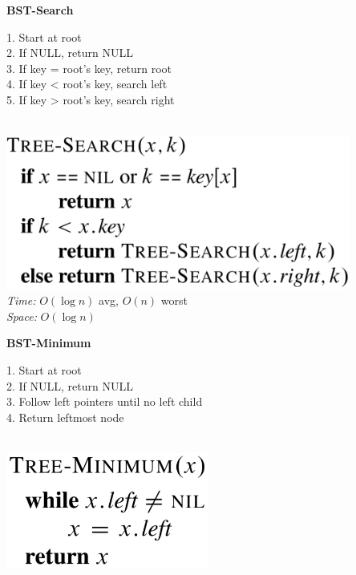 {\begin{minipage}[t]{1\textwidth}
    \begin{minipage}[t]{0.19\textwidth}
        \centering
        \textbf{\scriptsize BST-Search}\\[2pt]
        \scriptsize
        \begin{minipage}[t]{\textwidth}
            \scriptsize
            1. Start at root\\
            2. If NULL, return NULL\\
            3. If key = root's key, return root\\
            4. If key < root's key, search left\\
            5. If key > root's key, search right
        \end{minipage}\\[3pt]
        \includegraphics[width=0.85\textwidth]{images/bst-search.png}\\[2pt]
        \textit{Time:} \(O(\log n)\) avg, \(O(n)\) worst\\
        \textit{Space:} \(O(\log n)\)
    \end{minipage}
    \hfill
    \begin{minipage}[t]{0.19\textwidth}
        \centering
        \textbf{\scriptsize BST-Minimum}\\[2pt]
        \scriptsize
        \begin{minipage}[t]{\textwidth}
            \scriptsize
            1. Start at root\\
            2. If NULL, return NULL\\
            3. Follow left pointers until no left child\\
            4. Return leftmost node
        \end{minipage}\\[8pt]
        \includegraphics[width=0.5\textwidth]{images/bst-minimum.png}\\[2pt]

\end{minipage}
\end{minipage}}
